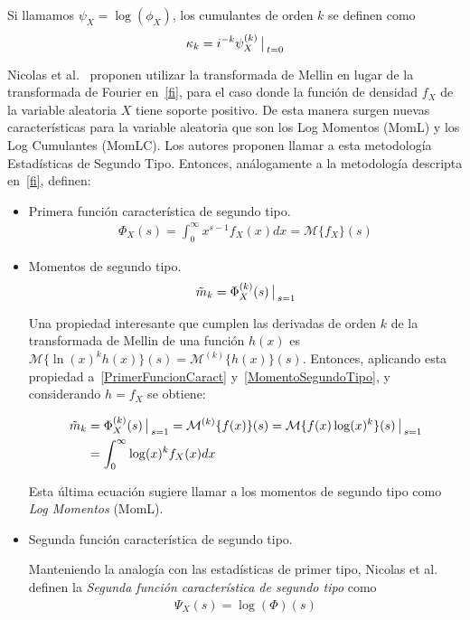 Si llamamos $\psi_X=\log(\phi_X)$, los cumulantes de orden $k$ se definen como 
\begin{align}
\label{CumulantePrimerTipo}
\kappa_k=i^{-k} \psi_X^{(k)}\big\arrowvert _{t=0}
\end{align}

Nicolas et al.~\cite{nicolas2002} proponen utilizar la transformada de Mellin en lugar de la transformada de Fourier en~\eqref{fi}, para el caso donde la función de densidad $f_X$ de la variable aleatoria $X$ tiene soporte positivo. De esta manera surgen nuevas características para la variable aleatoria que son los Log Momentos (MomL) y los Log Cumulantes (MomLC). Los autores proponen llamar a esta metodología Estadísticas de Segundo Tipo. Entonces, análogamente a la metodología descripta en~\ref{fi}, definen:
\begin{itemize}
\item Primera función característica de segundo tipo.
	\begin{align}
	\Phi_X(s)=\int_{0}^{\infty} x^{s-1} f_X(x) dx = \mathcal{M}\{f_X\}(s)
	\label{PrimerFuncionCaract}
	\end{align}
\item Momentos de segundo tipo.
	\begin{align}
	\label{MomentoSegundoTipo}
	\tilde{m}_k=\Phi_X^{(k)}(s) \big\arrowvert _{s=1}
	\end{align}


	Una propiedad interesante que cumplen las derivadas de orden $k$ de la transformada de Mellin de una función $h(x)$ es $\mathcal{M}\{\ln(x)^k h(x)\}(s)=\mathcal{M}^{(k)}\{h(x)\}(s)$. Entonces, aplicando esta propiedad a~\eqref{PrimerFuncionCaract} y~\eqref{MomentoSegundoTipo}, y considerando $h=f_X$ se obtiene:

	\begin{align}
	\label{MomL}
	\nonumber \tilde{m}_k&=\Phi_X^{(k)}(s) \big\arrowvert _{s=1} =\mathcal{M}^{(k)}\{f(x)\}(s) =\mathcal{M}\{f(x) \log(x)^k\}(s)\big\arrowvert _{s=1}          \\
 	        &=\int_{0}^{\infty} \log(x)^k f_X(x) dx 
	\end{align}

	Esta última ecuación sugiere llamar a los momentos de segundo tipo como \textit{Log Momentos} (MomL).
	
\item Segunda función característica de segundo tipo.

      Manteniendo la analogía con las estadísticas de primer tipo, Nicolas et al.~\cite{nicolas2002} definen la \textit{Segunda función característica de segundo tipo} como
      \begin{align}
      \label{Sgunda Psi}
      \Psi_X(s)=\log(\Phi)(s)
      \end{align}
      

\end{itemize}

